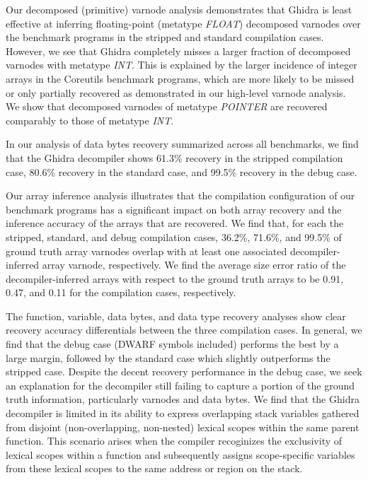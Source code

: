 Our decomposed (primitive) varnode analysis demonstrates that Ghidra is least effective at inferring floating-point (metatype \emph{FLOAT}) decomposed varnodes over the benchmark programs in the stripped and standard compilation cases. However, we see that Ghidra completely misses a larger fraction of decomposed varnodes with metatype \emph{INT}. This is explained by the larger incidence of integer arrays in the Coreutils benchmark programs, which are more likely to be missed or only partially recovered as demonstrated in our high-level varnode analysis. We show that decomposed varnodes of metatype \emph{POINTER} are recovered comparably to those of metatype \emph{INT}.

In our analysis of data bytes recovery summarized across all benchmarks, we find that the Ghidra decompiler shows 61.3\% recovery in the stripped compilation case, 80.6\% recovery in the standard case, and 99.5\% recovery in the debug case.

Our array inference analysis illustrates that the compilation configuration of our benchmark programs has a significant impact on both array recovery and the inference accuracy of the arrays that are recovered. We find that, for each the stripped, standard, and debug compilation cases, 36.2\%, 71.6\%, and 99.5\% of ground truth array varnodes overlap with at least one associated decompiler-inferred array varnode, respectively. We find the average size error ratio of the decompiler-inferred arrays with respect to the ground truth arrays to be 0.91, 0.47, and 0.11 for the compilation cases, respectively.

The function, variable, data bytes, and data type recovery analyses show clear recovery accuracy differentials between the three compilation cases. In general, we find that the debug case (DWARF symbols included) performs the best by a large margin, followed by the standard case which slightly outperforms the stripped case. Despite the decent recovery performance in the debug case, we seek an explanation for the decompiler still failing to capture a portion of the ground truth information, particularly varnodes and data bytes. We find that the Ghidra decompiler is limited in its ability to express overlapping stack variables gathered from disjoint (non-overlapping, non-nested) lexical scopes within the same parent function. This scenario arises when the compiler recoginizes the exclusivity of lexical scopes within a function and subsequently assigns scope-specific variables from these lexical scopes to the same address or region on the stack.

